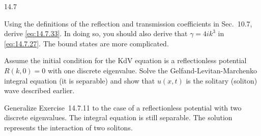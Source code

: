 \begin{exercises}{14.7}
\item Using the definitions of the reflection and transmission coefficients in Sec.~10.7, derive \eqref{eq:14.7.33}.  In doing so, you should also derive that $\gamma = 4ik^3$ in \eqref{eq:14.7.27}.  The bound states are more complicated.

\item Assume the initial condition for the KdV equation is a reflectionless potential $R(k,0) = 0$ with one discrete eigenvalue.  Solve the Gelfand-Levitan-Marchenko integral equation (it is separable) and show that $u(x,t)$ is the solitary (soliton) wave described earlier.

\item Generalize Exercise~14.7.11 to the case of a reflectionless potential with two discrete eigenvalues.  The integral equation is still separable.  The solution represents the interaction of two solitons.
\end{exercises}
